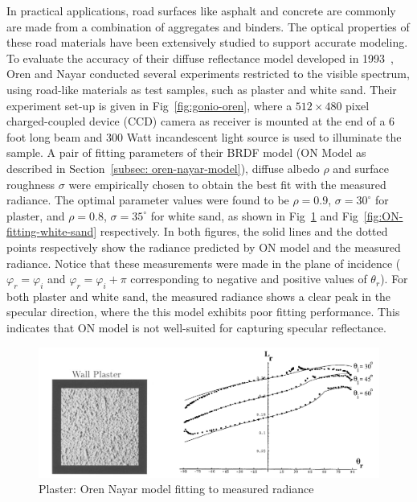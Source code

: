 In practical applications, road surfaces like asphalt and concrete are commonly are made from a combination of aggregates and binders.
The optical properties of these road materials have been extensively studied to support accurate modeling.
To evaluate the accuracy of their diffuse reflectance model developed in 1993~\cite{1995_Oren}, Oren and Nayar conducted several experiments restricted to the visible spectrum, using road-like materials as test samples, such as plaster and white sand.
Their experiment set-up is given in Fig~\ref{fig:gonio-oren}, where a $512\times 480 $ pixel charged-coupled device (CCD) camera as receiver is mounted at the end of a 6 foot long beam and $300 $ Watt incandescent light source is used to illuminate the sample.
A pair of fitting parameters of their BRDF model (ON Model as described in Section~\eqref{subsec: oren-nayar-model}), diffuse albedo $\rho$ and surface roughness $\sigma$ were empirically chosen to obtain the best fit with the measured radiance.
The optimal parameter values were found to be $\rho = 0.9$, $\sigma = 30^\circ$ for plaster, and $\rho = 0.8$, $\sigma = 35^\circ$ for white sand, as shown in Fig~\ref{fig:ON-fitting-plaster} and Fig~\ref{fig:ON-fitting-white-sand} respectively.
In both figures, the solid lines and the dotted points respectively show the radiance predicted by ON model and the measured radiance.
Notice that these measurements were made in the plane of incidence ($\varphi_r =\varphi_i$ and $\varphi_r =\varphi_i +\pi$ corresponding to negative and positive values of $\theta_r$).
For both plaster and white sand, the measured radiance shows a clear peak in the specular direction, where the this model exhibits poor fitting performance.
This indicates that ON model is not well-suited for capturing specular reflectance.

\begin{figure}[!tb]
    \centering
    \includegraphics[width=0.9\linewidth]{./figures/measurement-literature/ON-fitting-plaster-full.png}
    \caption{Plaster: Oren Nayar model fitting to measured radiance}
    \label{fig:ON-fitting-plaster}
\end{figure}

